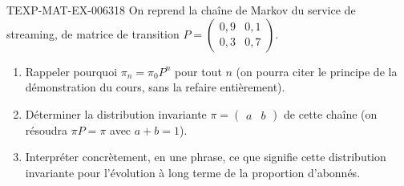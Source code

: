 \begin{exercice}{TEXP-MAT-EX-006}{3}{18}
On reprend la chaîne de Markov du service de streaming, de matrice de transition $P=\begin{pmatrix}0{,}9&0{,}1\\0{,}3&0{,}7\end{pmatrix}$.
\begin{enumerate}
  \item Rappeler pourquoi $\pi_n=\pi_0P^n$ pour tout $n$ (on pourra citer le principe de la démonstration du cours, sans la refaire entièrement).
  \item Déterminer la distribution invariante $\pi=\begin{pmatrix}a&b\end{pmatrix}$ de cette chaîne (on résoudra $\pi P=\pi$ avec $a+b=1$).
  \item Interpréter concrètement, en une phrase, ce que signifie cette distribution invariante pour l'évolution à long terme de la proportion d'abonnés.
\end{enumerate}
\end{exercice}
